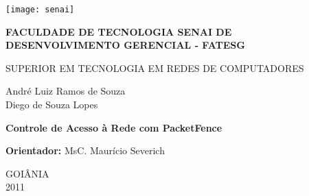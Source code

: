 \documentclass[brazil, ruledheader, pnumromarab,normaltoc]{abnt}
\begin{document}
\begin{titlepage}
\begin{center}


\texttt{[image: senai]}


\textbf{FACULDADE DE TECNOLOGIA SENAI DE\\DESENVOLVIMENTO GERENCIAL - FATESG}

\textsc{SUPERIOR EM TECNOLOGIA EM REDES DE COMPUTADORES}

\vspace{2.5cm}

\large André Luiz Ramos de Souza\\Diego de Souza Lopes

\vspace{4cm}

\textbf{\LARGE Controle de Acesso à Rede com PacketFence}

\vspace{2.5cm}

\textbf{Orientador:} MsC. Maurício Severich

\vspace{4cm}

\large GOIÂNIA\\

\large 2011

\end{center}
\end{titlepage}



\sumario


\end{document}
